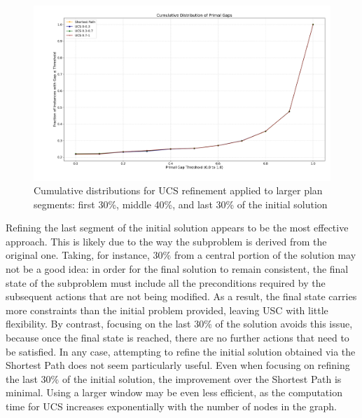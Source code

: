 \begin{figure}[ht]
	\centering
	\includegraphics[width=\textwidth]{images/ucs_3_intervals.png}
	\caption{Cumulative distributions for UCS refinement applied to larger plan segments: first 30\%, middle 40\%, and last 30\% of the initial solution}
	\label{fig:ucs_3intervals}
\end{figure}

Refining the last segment of the initial solution appears to be the most effective approach. This is likely due to the way the subproblem is derived from
the original one. Taking, for instance, 30\% from a central portion of the solution may not be a good idea: in order for the final solution to remain
consistent, the final state of the subproblem must include all the preconditions required by the subsequent actions that are not being modified.
As a result, the final state carries more constraints than the initial problem provided, leaving \textsc{USC} with little flexibility. By contrast,
focusing on the last 30\% of the solution avoids this issue, because once the final state is reached, there are no further actions that need to be satisfied.
In any case, attempting to refine the initial solution obtained via the Shortest Path does not seem particularly useful. Even when focusing on refining
the last 30\% of the initial solution, the improvement over the Shortest Path is minimal. Using a larger window may be even less efficient,
as the computation time for \textsc{UCS} increases exponentially with the number of nodes in the graph.
